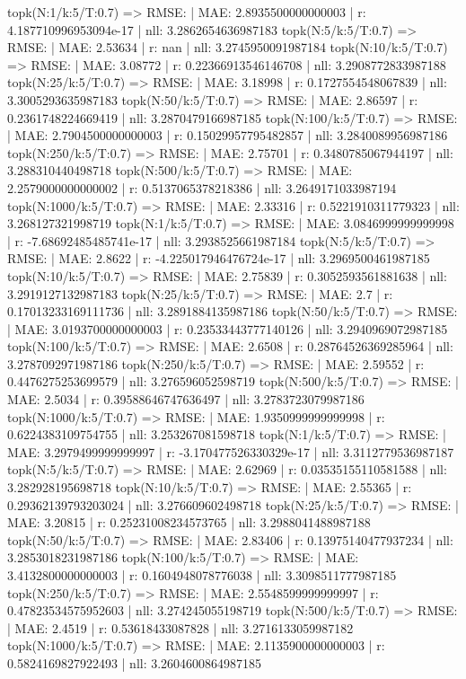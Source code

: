 topk(N:1/k:5/T:0.7) => RMSE: | MAE: 2.8935500000000003 | r: 4.187710996953094e-17 | nll: 3.2862654636987183
topk(N:5/k:5/T:0.7) => RMSE: | MAE: 2.53634 | r: nan | nll: 3.2745950091987184
topk(N:10/k:5/T:0.7) => RMSE: | MAE: 3.08772 | r: 0.22366913546146708 | nll: 3.2908772833987188
topk(N:25/k:5/T:0.7) => RMSE: | MAE: 3.18998 | r: 0.1727554548067839 | nll: 3.3005293635987183
topk(N:50/k:5/T:0.7) => RMSE: | MAE: 2.86597 | r: 0.2361748224669419 | nll: 3.2870479166987185
topk(N:100/k:5/T:0.7) => RMSE: | MAE: 2.7904500000000003 | r: 0.15029957795482857 | nll: 3.2840089956987186
topk(N:250/k:5/T:0.7) => RMSE: | MAE: 2.75701 | r: 0.3480785067944197 | nll: 3.288310440498718
topk(N:500/k:5/T:0.7) => RMSE: | MAE: 2.2579000000000002 | r: 0.5137065378218386 | nll: 3.2649171033987194
topk(N:1000/k:5/T:0.7) => RMSE: | MAE: 2.33316 | r: 0.5221910311779323 | nll: 3.268127321998719
topk(N:1/k:5/T:0.7) => RMSE: | MAE: 3.0846999999999998 | r: -7.68692485485741e-17 | nll: 3.2938525661987184
topk(N:5/k:5/T:0.7) => RMSE: | MAE: 2.8622 | r: -4.225017946476724e-17 | nll: 3.2969500461987185
topk(N:10/k:5/T:0.7) => RMSE: | MAE: 2.75839 | r: 0.3052593561881638 | nll: 3.2919127132987183
topk(N:25/k:5/T:0.7) => RMSE: | MAE: 2.7 | r: 0.17013233169111736 | nll: 3.2891884135987186
topk(N:50/k:5/T:0.7) => RMSE: | MAE: 3.0193700000000003 | r: 0.23533443777140126 | nll: 3.2940969072987185
topk(N:100/k:5/T:0.7) => RMSE: | MAE: 2.6508 | r: 0.28764526369285964 | nll: 3.2787092971987186
topk(N:250/k:5/T:0.7) => RMSE: | MAE: 2.59552 | r: 0.4476275253699579 | nll: 3.276596052598719
topk(N:500/k:5/T:0.7) => RMSE: | MAE: 2.5034 | r: 0.39588646747636497 | nll: 3.2783723079987186
topk(N:1000/k:5/T:0.7) => RMSE: | MAE: 1.9350999999999998 | r: 0.6224383109754755 | nll: 3.253267081598718
topk(N:1/k:5/T:0.7) => RMSE: | MAE: 3.2979499999999997 | r: -3.170477526330329e-17 | nll: 3.3112779536987187
topk(N:5/k:5/T:0.7) => RMSE: | MAE: 2.62969 | r: 0.03535155110581588 | nll: 3.282928195698718
topk(N:10/k:5/T:0.7) => RMSE: | MAE: 2.55365 | r: 0.29362139793203024 | nll: 3.276609602498718
topk(N:25/k:5/T:0.7) => RMSE: | MAE: 3.20815 | r: 0.25231008234573765 | nll: 3.2988041488987188
topk(N:50/k:5/T:0.7) => RMSE: | MAE: 2.83406 | r: 0.13975140477937234 | nll: 3.2853018231987186
topk(N:100/k:5/T:0.7) => RMSE: | MAE: 3.4132800000000003 | r: 0.1604948078776038 | nll: 3.3098511777987185
topk(N:250/k:5/T:0.7) => RMSE: | MAE: 2.5548599999999997 | r: 0.47823534575952603 | nll: 3.274245055198719
topk(N:500/k:5/T:0.7) => RMSE: | MAE: 2.4519 | r: 0.53618433087828 | nll: 3.2716133059987182
topk(N:1000/k:5/T:0.7) => RMSE: | MAE: 2.1135900000000003 | r: 0.5824169827922493 | nll: 3.2604600864987185
